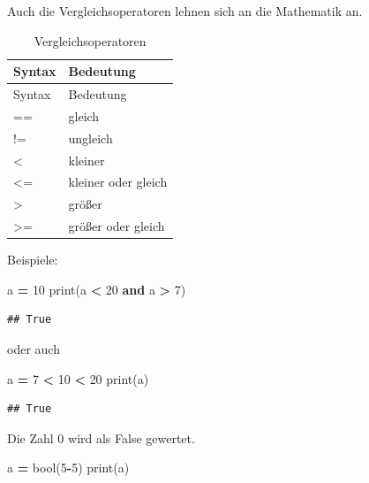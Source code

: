 \documentclass[
]{book}
\newenvironment{Shaded}{\begin{snugshade}}{\end{snugshade}}
\newcommand{\BuiltInTok}[1]{#1}
\newcommand{\DecValTok}[1]{\textcolor[rgb]{0.00,0.00,0.81}{#1}}
\newcommand{\KeywordTok}[1]{\textcolor[rgb]{0.13,0.29,0.53}{\textbf{#1}}}
\newcommand{\NormalTok}[1]{#1}
\newcommand{\OperatorTok}[1]{\textcolor[rgb]{0.81,0.36,0.00}{\textbf{#1}}}
\begin{document}
Auch die Vergleichsoperatoren lehnen sich an die Mathematik an.

\begin{longtable}[]{@{}ll@{}}
\caption{Vergleichsoperatoren}\tabularnewline
\toprule()
Syntax & Bedeutung \\
\midrule()
\endfirsthead
\toprule()
Syntax & Bedeutung \\
\midrule()
\endhead
== & gleich \\
!= & ungleich \\
\textless{} & kleiner \\
\textless= & kleiner oder gleich \\
\textgreater{} & größer \\
\textgreater= & größer oder gleich \\
\bottomrule()
\end{longtable}

Beispiele:

\begin{Shaded}
\begin{Highlighting}[]
\NormalTok{a }\OperatorTok{=} \DecValTok{10}
\BuiltInTok{print}\NormalTok{(a }\OperatorTok{\textless{}} \DecValTok{20} \KeywordTok{and}\NormalTok{ a }\OperatorTok{\textgreater{}} \DecValTok{7}\NormalTok{)}
\end{Highlighting}
\end{Shaded}

\begin{verbatim}
## True
\end{verbatim}

oder auch

\begin{Shaded}
\begin{Highlighting}[]
\NormalTok{a }\OperatorTok{=} \DecValTok{7} \OperatorTok{\textless{}} \DecValTok{10} \OperatorTok{\textless{}} \DecValTok{20}
\BuiltInTok{print}\NormalTok{(a)}
\end{Highlighting}
\end{Shaded}

\begin{verbatim}
## True
\end{verbatim}

Die Zahl 0 wird als False gewertet.

\begin{Shaded}
\begin{Highlighting}[]
\NormalTok{a }\OperatorTok{=} \BuiltInTok{bool}\NormalTok{(}\DecValTok{5}\OperatorTok{{-}}\DecValTok{5}\NormalTok{)}
\BuiltInTok{print}\NormalTok{(a)}
\end{Highlighting}
\end{Shaded}
\end{document}
